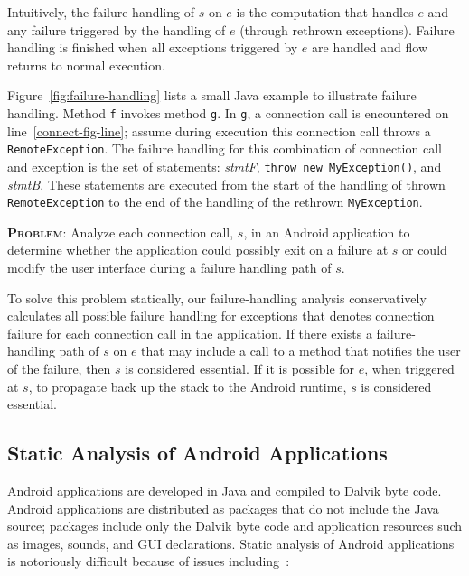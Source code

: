 Intuitively, the failure handling of $s$ on $e$ is the computation
that handles $e$ and any failure triggered by the handling of $e$
(through rethrown exceptions).  Failure handling is finished when all
exceptions triggered by $e$ are handled and flow returns to normal
execution.  

Figure~\ref{fig:failure-handling} lists a small Java example to
illustrate failure handling.  Method \lstinline!f! invokes method
\lstinline!g!.  In \lstinline!g!, a connection call is encountered on
line~\ref{connect-fig-line}; assume during execution this connection call
throws a \lstinline!RemoteException!.  The failure handling for this
combination of connection call and exception is the set of statements:
{\it stmtF}, \lstinline!throw new MyException()!, and {\it stmtB}.
These statements are executed from the start of the handling of thrown
\lstinline!RemoteException! to the end of the handling of the rethrown
\lstinline!MyException!.

\noindent\textsc{\bfseries{Problem}}: Analyze each connection call,
$s$, in an Android application to determine whether the application
could possibly exit on a failure at $s$ or could modify the user
interface during a failure handling path of $s$.

To solve this problem statically, our failure-handling analysis
conservatively calculates all possible failure handling for exceptions
that denotes connection failure for each connection call in the
application.  If there exists a failure-handling path of $s$ on $e$
that may include a call to a method that notifies the user of the
failure, then $s$ is considered essential.  If it is possible for $e$,
when triggered at $s$, to propagate back up the stack to the Android
runtime, $s$ is considered essential.

\subsection{Static Analysis of Android Applications}

Android applications are developed in Java and compiled to Dalvik byte
code.  Android applications are distributed as packages that do not
include the Java source; packages include only the Dalvik byte code
and application resources such as images, sounds, and GUI
declarations.  Static analysis of Android applications is notoriously
difficult because of issues including~\cite{Gordon:Kim:Perkins:Gilham:Nguyen:Rinard:NDSS15}: 

